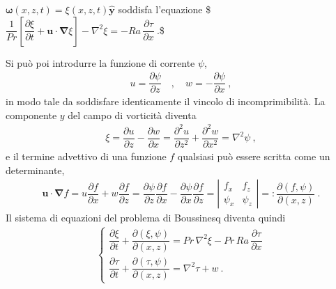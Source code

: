 \documentclass[letterpaper,10pt,italian]{jupyterBook}
\begin{document}
\sphinxAtStartPar
\(\mathbf{\omega}(x,z,t) = \xi(x,z,t) \mathbf{\hat{y}}\) soddisfa l’equazione
\$\(\dfrac{1}{Pr} \left[ \dfrac{\partial \xi}{\partial t} +
      \mathbf{u} \cdot \mathbf{\nabla} \xi \right] -
      \nabla^2 \xi = - Ra \, \dfrac{\partial \tau}{\partial x} \ .\)\$

\sphinxAtStartPar
Si può poi introdurre la funzione di corrente \(\psi\),
\begin{equation*}
\begin{split}u =   \dfrac{\partial \psi}{ \partial z} \quad , \quad 
    w = - \dfrac{\partial \psi}{ \partial x} \ ,\end{split}
\end{equation*}
\sphinxAtStartPar
in modo tale da soddisfare identicamente il vincolo di incomprimibilità. La componente
\(y\) del campo di vorticità diventa
\begin{equation*}
\begin{split}\xi = \dfrac{\partial u}{\partial z} - \dfrac{\partial w}{\partial x} =
    \dfrac{\partial^2 u}{\partial z^2} +
    \dfrac{\partial^2 w}{\partial x^2} = 
    \nabla^2 \psi \ ,\end{split}
\end{equation*}
\sphinxAtStartPar
e il termine advettivo di una funzione \(f\)
qualsiasi può essere scritta come un determinante,
\begin{equation*}
\begin{split}\mathbf{u} \cdot \mathbf{\nabla} f = u \dfrac{\partial f}{\partial x} + w \dfrac{\partial f}{\partial z} =
    \dfrac{\partial \psi}{ \partial z} \dfrac{\partial f}{\partial x} - \dfrac{\partial \psi}{ \partial x} \dfrac{\partial f}{\partial z} = \left| \begin{matrix} f_x & f_z \\ \psi_x & \psi_z \end{matrix} \right| =: \dfrac{\partial(f,\psi)}{\partial(x,z)} \ .\end{split}
\end{equation*}
\sphinxAtStartPar
Il sistema di equazioni del problema di Boussinesq diventa quindi
\begin{equation*}
\begin{split}\label{eqn:Bouss-vort-psi-tau}
    \begin{cases}
      \dfrac{\partial \xi}{\partial t} +
      \dfrac{\partial(\xi,\psi)}{\partial(x,z)} 
      = Pr \, \nabla^2 \xi 
      - Pr \, Ra \, \dfrac{\partial \tau}{\partial x} \\
      \dfrac{\partial \tau}{\partial t} +
      \dfrac{\partial(\tau,\psi)}{\partial(x,z)} =
      \nabla^{2} \tau + w \ .
\end{cases}\end{split}
\end{equation*}
\end{document}
